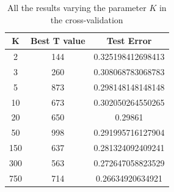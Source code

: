 \begin{table}
\centering
\begin{tabular}{|c|c|c|}
	\hline 
	K & Best T value & Test Error \\ 
	\hline 
	2 & 144 & 0.325198412698413 \\ 
	\hline 
	3 & 260 & 0.308068783068783 \\ 
	\hline 
	5 & 873 & 0.298148148148148 \\ 
	\hline 
	10 & 673 & 0.302050264550265 \\ 
	\hline 
	20 & 650 & 0.29861 \\ 
	\hline 
	50 & 998 & 0.291995716127904 \\ 
	\hline 
	150 & 637 & 0.281324092409241 \\ 
	\hline 
	300 & 563 & 0.272647058823529 \\ 
	\hline 
	750 & 714 & 0.26634920634921 \\ 
	\hline 
\end{tabular}
\caption{All the results varying the parameter $K$ in the cross-validation}
\label{tab:results} 
\end{table}
